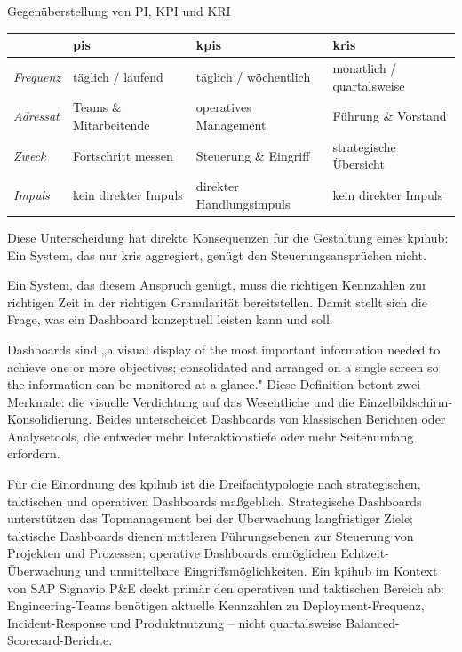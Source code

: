 \begin{batable}[label=tab:kpi-hierarchie]{Gegenüberstellung von PI, KPI und KRI}
\small\setlength{\tabcolsep}{10pt}\renewcommand{\arraystretch}{1.4}
\begin{tabular}{|l|p{3.3cm}|p{3.3cm}|p{3.3cm}|}
\hline
 & \textbf{\glspl{pi}} & \textbf{\glspl{kpi}} & \textbf{\glspl{kri}} \\
\hline
\textit{Frequenz}  & täglich / laufend       & täglich / wöchentlich    & monatlich / quartalsweise \\
\hline
\textit{Adressat}  & Teams \& Mitarbeitende  & operatives Management    & Führung \& Vorstand \\
\hline
\textit{Zweck}     & Fortschritt messen      & Steuerung \& Eingriff    & strategische Übersicht \\
\hline
\textit{Impuls}    & kein direkter Impuls    & direkter Handlungsimpuls & kein direkter Impuls \\
\hline
\end{tabular}
\end{batable}

Diese Unterscheidung hat direkte Konsequenzen für die Gestaltung eines \gls{kpihub}: Ein System, das nur \glspl{kri} aggregiert, genügt den Steuerungsansprüchen nicht.

Ein System, das diesem Anspruch genügt, muss die richtigen Kennzahlen zur richtigen Zeit in der richtigen Granularität bereitstellen. Damit stellt sich die Frage, was ein Dashboard konzeptuell leisten kann und soll.

Dashboards sind „a visual display of the most important information needed to achieve one or more objectives; consolidated and arranged on a single screen so the information can be monitored at a glance."
Diese Definition betont zwei Merkmale: die visuelle Verdichtung auf das Wesentliche und die Einzelbildschirm-Konsolidierung.
Beides unterscheidet Dashboards von klassischen Berichten oder Analysetools, die entweder mehr Interaktionstiefe oder mehr Seitenumfang erfordern.

Für die Einordnung des \gls{kpihub} ist die Dreifachtypologie nach strategischen, taktischen und operativen Dashboards maßgeblich.
Strategische Dashboards unterstützen das Topmanagement bei der Überwachung langfristiger Ziele; taktische Dashboards dienen mittleren Führungsebenen zur Steuerung von Projekten und Prozessen; operative Dashboards ermöglichen Echtzeit-Überwachung und unmittelbare Eingriffs\-möglichkeiten.
Ein \gls{kpihub} im Kontext von SAP Signavio P\&E deckt primär den operativen und taktischen Bereich ab: Engineering-Teams benötigen aktuelle Kennzahlen zu Deployment-Frequenz, Incident-Response und Produktnutzung -- nicht quartalsweise Balanced-Score\-card-Berichte.

